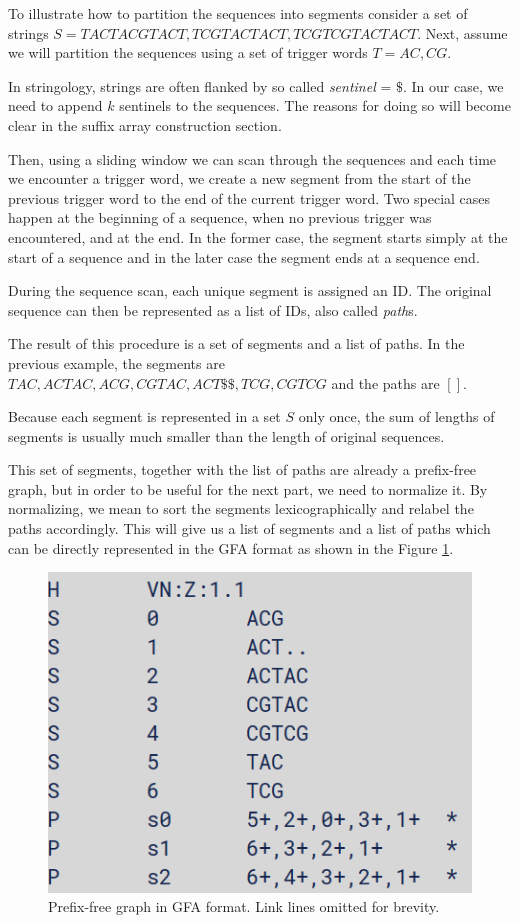 \documentclass[twocolumn]{ceurart}
\begin{document}
To illustrate how to partition the sequences into segments consider a set of
strings $S = {TACTACGTACT, TCGTACTACT, TCGTCGTACTACT}$.
Next, assume we will partition the sequences using a set of trigger words 
$T = {AC, CG}$.

In stringology, strings are often flanked by so called \emph{sentinel} = $\$$.
In our case, we need to append $k$ sentinels to the sequences.
The reasons for doing so will become clear in the suffix array construction section.

Then, using a sliding window we can scan through the sequences and each time we
encounter a trigger word, we create a new segment from the start of the previous
trigger word to the end of the current trigger word.
Two special cases happen at the beginning of a sequence, when no previous
trigger was encountered, and at the end.
In the former case, the segment starts simply at the start of a sequence and in
the later case the segment ends at a sequence end.

During the sequence scan, each unique segment is assigned an ID.
The original sequence can then be represented as a list of IDs, also called 
\emph{path}s.

The result of this procedure is a set of segments and a list of paths.
In the previous example, the segments are ${ TAC, ACTAC, ACG, CGTAC, ACT\$\$, TCG, CGTCG }$
and the paths are $[  ]$.

Because each segment is represented in a set $S$ only once, the sum of lengths
of segments is usually much smaller than the length of original sequences.

This set of segments, together with the list of paths are already a prefix-free
graph, but in order to be useful for the next part, we need to normalize it.
By normalizing, we mean to sort the segments lexicographically and relabel the
paths accordingly.
This will give us a list of segments and a list of paths which can be directly
represented in the GFA format as shown in the Figure \ref{fig:gfa}.

\begin{figure}
    \centering
    \includegraphics[width=\linewidth]{images/pfg.png}
    \caption{Prefix-free graph in GFA format. Link lines omitted for brevity.}
    \label{fig:gfa}
\end{figure}
\end{document}
